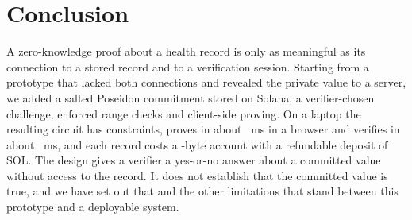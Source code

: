 \section{Conclusion}\label{sec:conclusion}

A zero-knowledge proof about a health record is only as meaningful as its
connection to a stored record and to a verification session. Starting from a
prototype that lacked both connections and revealed the private value to a
server, we added a salted Poseidon commitment stored on Solana, a
verifier-chosen challenge, enforced range checks and client-side proving.
On a laptop the resulting circuit has \NewConstraints{} constraints, proves
in about \BrowserProveMs~ms in a browser and verifies in about
\NewVerifyMs~ms, and each record costs a \AccountBytes-byte account with a
refundable deposit of \RentSol{} SOL. The design gives a verifier a
yes-or-no answer about a committed value without access to the record. It
does not establish that the committed value is true, and we have set out
that and the other limitations that stand between this prototype and a
deployable system.
